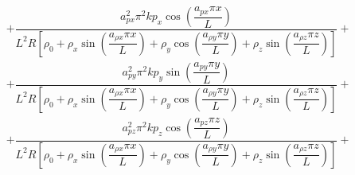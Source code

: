 \documentclass[10pt]{article}
\begin{document}
\begin{landscape}
\begin{equation*}
\begin{split}
%
&+  \dfrac{a_{px}^2 \pi^2 k p_x \cos\left(\dfrac{a_{px} \pi x}{L}\right)}{L^2 R \left[\rho_0+\rho_x \sin\left(\dfrac{a_{\rho x} \pi x}{L}\right)+\rho_y \cos\left(\dfrac{a_{\rho y} \pi y}{L}\right)+\rho_z \sin\left(\dfrac{a_{\rho z} \pi z}{L}\right)\right]}+\\
%
&+\dfrac{a_{py}^2 \pi^2 k p_y \sin\left(\dfrac{a_{py} \pi y}{L}\right)}{L^2 R \left[\rho_0+\rho_x \sin\left(\dfrac{a_{\rho x} \pi x}{L}\right)+\rho_y \cos\left(\dfrac{a_{\rho y} \pi y}{L}\right)+\rho_z \sin\left(\dfrac{a_{\rho z} \pi z}{L}\right)\right]}+ \\
%
&+\dfrac{a_{pz}^2 \pi^2 k p_z \cos\left(\dfrac{a_{pz} \pi z}{L}\right)}{L^2 R \left[\rho_0+\rho_x \sin\left(\dfrac{a_{\rho x} \pi x}{L}\right)+\rho_y \cos\left(\dfrac{a_{\rho y} \pi y}{L}\right)+\rho_z \sin\left(\dfrac{a_{\rho z} \pi z}{L}\right)\right]}+ \\
\end{split}
\end{equation*}


\end{landscape}
\end{document}
